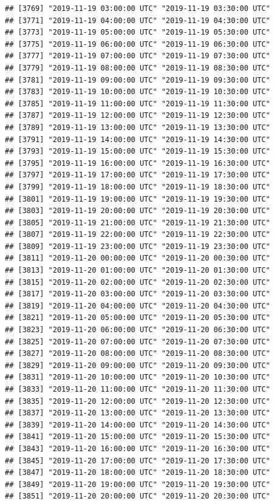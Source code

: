 \documentclass{article}\usepackage[]{graphicx}\usepackage[]{color}
\makeatletter
\newenvironment{kframe}{%
 \def\at@end@of@kframe{}%
 \ifinner\ifhmode%
  \def\at@end@of@kframe{\end{minipage}}%
  \begin{minipage}{\columnwidth}%
 \fi\fi%
 \def\FrameCommand##1{\hskip\@totalleftmargin \hskip-\fboxsep
 \colorbox{shadecolor}{##1}\hskip-\fboxsep
     \hskip-\linewidth \hskip-\@totalleftmargin \hskip\columnwidth}%
 \MakeFramed {\advance\hsize-\width
   \@totalleftmargin\z@ \linewidth\hsize
   \@setminipage}}%
 {\par\unskip\endMakeFramed%
 \at@end@of@kframe}
\newenvironment{knitrout}{}{} %
\makeatother
\begin{document}
\begin{knitrout}
\begin{kframe}
\begin{verbatim}
## [3769] "2019-11-19 03:00:00 UTC" "2019-11-19 03:30:00 UTC"
## [3771] "2019-11-19 04:00:00 UTC" "2019-11-19 04:30:00 UTC"
## [3773] "2019-11-19 05:00:00 UTC" "2019-11-19 05:30:00 UTC"
## [3775] "2019-11-19 06:00:00 UTC" "2019-11-19 06:30:00 UTC"
## [3777] "2019-11-19 07:00:00 UTC" "2019-11-19 07:30:00 UTC"
## [3779] "2019-11-19 08:00:00 UTC" "2019-11-19 08:30:00 UTC"
## [3781] "2019-11-19 09:00:00 UTC" "2019-11-19 09:30:00 UTC"
## [3783] "2019-11-19 10:00:00 UTC" "2019-11-19 10:30:00 UTC"
## [3785] "2019-11-19 11:00:00 UTC" "2019-11-19 11:30:00 UTC"
## [3787] "2019-11-19 12:00:00 UTC" "2019-11-19 12:30:00 UTC"
## [3789] "2019-11-19 13:00:00 UTC" "2019-11-19 13:30:00 UTC"
## [3791] "2019-11-19 14:00:00 UTC" "2019-11-19 14:30:00 UTC"
## [3793] "2019-11-19 15:00:00 UTC" "2019-11-19 15:30:00 UTC"
## [3795] "2019-11-19 16:00:00 UTC" "2019-11-19 16:30:00 UTC"
## [3797] "2019-11-19 17:00:00 UTC" "2019-11-19 17:30:00 UTC"
## [3799] "2019-11-19 18:00:00 UTC" "2019-11-19 18:30:00 UTC"
## [3801] "2019-11-19 19:00:00 UTC" "2019-11-19 19:30:00 UTC"
## [3803] "2019-11-19 20:00:00 UTC" "2019-11-19 20:30:00 UTC"
## [3805] "2019-11-19 21:00:00 UTC" "2019-11-19 21:30:00 UTC"
## [3807] "2019-11-19 22:00:00 UTC" "2019-11-19 22:30:00 UTC"
## [3809] "2019-11-19 23:00:00 UTC" "2019-11-19 23:30:00 UTC"
## [3811] "2019-11-20 00:00:00 UTC" "2019-11-20 00:30:00 UTC"
## [3813] "2019-11-20 01:00:00 UTC" "2019-11-20 01:30:00 UTC"
## [3815] "2019-11-20 02:00:00 UTC" "2019-11-20 02:30:00 UTC"
## [3817] "2019-11-20 03:00:00 UTC" "2019-11-20 03:30:00 UTC"
## [3819] "2019-11-20 04:00:00 UTC" "2019-11-20 04:30:00 UTC"
## [3821] "2019-11-20 05:00:00 UTC" "2019-11-20 05:30:00 UTC"
## [3823] "2019-11-20 06:00:00 UTC" "2019-11-20 06:30:00 UTC"
## [3825] "2019-11-20 07:00:00 UTC" "2019-11-20 07:30:00 UTC"
## [3827] "2019-11-20 08:00:00 UTC" "2019-11-20 08:30:00 UTC"
## [3829] "2019-11-20 09:00:00 UTC" "2019-11-20 09:30:00 UTC"
## [3831] "2019-11-20 10:00:00 UTC" "2019-11-20 10:30:00 UTC"
## [3833] "2019-11-20 11:00:00 UTC" "2019-11-20 11:30:00 UTC"
## [3835] "2019-11-20 12:00:00 UTC" "2019-11-20 12:30:00 UTC"
## [3837] "2019-11-20 13:00:00 UTC" "2019-11-20 13:30:00 UTC"
## [3839] "2019-11-20 14:00:00 UTC" "2019-11-20 14:30:00 UTC"
## [3841] "2019-11-20 15:00:00 UTC" "2019-11-20 15:30:00 UTC"
## [3843] "2019-11-20 16:00:00 UTC" "2019-11-20 16:30:00 UTC"
## [3845] "2019-11-20 17:00:00 UTC" "2019-11-20 17:30:00 UTC"
## [3847] "2019-11-20 18:00:00 UTC" "2019-11-20 18:30:00 UTC"
## [3849] "2019-11-20 19:00:00 UTC" "2019-11-20 19:30:00 UTC"
## [3851] "2019-11-20 20:00:00 UTC" "2019-11-20 20:30:00 UTC"

\end{verbatim}
\end{kframe}
\end{knitrout}
\end{document}
